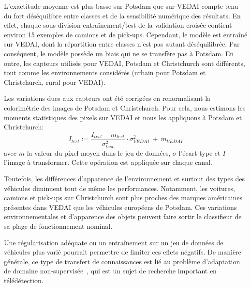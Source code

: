 L'exactitude moyenne est plus basse sur Potsdam que sur \gls{VEDAI} compte-tenu du fort déséquilibre entre classes et de la sensibilité numérique des résultats. En effet, chaque sous-division entraînement/test de la validation croisée contient environ 15 exemples de camions et de pick-ups. Cependant, le modèle est entraîné sur \gls{VEDAI}, dont la répartition entre classes n'est pas autant déséquilibrée. Par conséquent, le modèle possède un biais qui ne se transfère pas à Potsdam. En outre, les capteurs utilisés pour \gls{VEDAI}, Potsdam et Christchurch sont différents, tout comme les environnements considérés (urbain pour Potsdam et Christchurch, rural pour \gls{VEDAI}).

Les variations dues aux capteurs ont été corrigées en renormalisant la colorimétrie des images de Potsdam et Christchurch. Pour cela, nous estimons les moments statistiques des pixels sur \gls{VEDAI} et nous les appliquons à Potsdam et Christchurch:
\begin{equation}
I_\mathit{test} := \frac{I_\mathit{test} - m_\mathit{test}}{\sigma^2_\mathit{test}} \cdot \sigma^2_\mathit{VEDAI}~+~m_\mathit{VEDAI}
\end{equation}
avec $m$ la valeur du pixel moyen dans le jeu de données, $\sigma$ l'écart-type et $I$ l'image à transformer. Cette opération est appliquée sur chaque canal.

Toutefois, les différences d'apparence de l'environnement et surtout des types des véhicules diminuent tout de même les performances. Notamment, les voitures, camions et pick-ups sur Christchurch sont plus proches des marques américaines présentes dans \gls{VEDAI} que les véhicules européens de Potsdam. Ces variations environnementales et d'apparence des objets peuvent faire sortir le classifieur de sa plage de fonctionnement nominal.

Une régularisation adéquate ou un entraînement sur un jeu de données de véhicules plus varié pourrait permettre de limiter ces effets négatifs. De manière générale, ce type de transfert de connaissances est lié au problème d'adaptation de domaine non-supervisée~\cite{tuia_domain_2016,courty_optimal_2016}, qui est un sujet de recherche important en télédétection.

